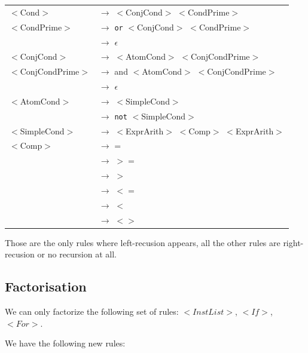 \documentclass[letterpaper]{article}
\begin{document}
\begin{center}
        \begin{tabular}{l l}
            $<$Cond$>$ & $\rightarrow$ $<$ConjCond$>$ $<$CondPrime$>$ \\


            $<$CondPrime$>$ & $\rightarrow$
            \texttt{or} $<$ConjCond$>$ $<$CondPrime$>$ \\
             & $\rightarrow$ $\epsilon$ \\

            $<$ConjCond$>$ & $\rightarrow$ $<$AtomCond$>$ $<$ConjCondPrime$>$ \\


            $<$ConjCondPrime$>$ & $\rightarrow$
            and $<$AtomCond$>$ $<$ConjCondPrime$>$ \\
             & $\rightarrow$ $\epsilon$\\

            $<$AtomCond$>$ & $\rightarrow$ $<$SimpleCond$>$\\
             & $\rightarrow$ \texttt{not} $<$SimpleCond$>$\\

            $<$SimpleCond$>$ & $\rightarrow$
            $<$ExprArith$>$ $<$Comp$>$ $<$ExprArith$>$\\

            $<$Comp$>$ & $\rightarrow$ =\\
             & $\rightarrow$ $>=$\\
             & $\rightarrow$ $>$\\
             & $\rightarrow$ $<=$\\
             & $\rightarrow$ $<$\\
             & $\rightarrow$ $<>$\\

        \end{tabular}
\end{center}

Those are the only rules where left-recusion appears, all the other rules
are right-recusion or no recursion at all.

\subsection{Factorisation}

We can only factorize the following set of rules: $<InstList>$, $<If>$, $<For>$.

We have the following new rules:
\end{document}
